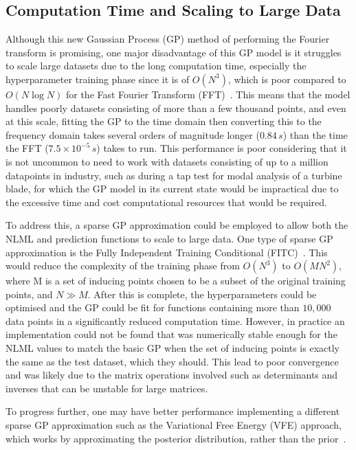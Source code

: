 \documentclass[12pt]{article}
\begin{document}
    \subsection{Computation Time and Scaling to Large Data}
    Although this new Gaussian Process (GP) method of performing the Fourier transform is promising, one major disadvantage of this GP model is it struggles to scale large datasets due to the long computation time, especially the hyperparameter training phase since it is of $O(N^3)$, which is poor compared to $O(N \log{N})$ for the Fast Fourier Transform (FFT)~\cite{murphy2023probabilistic}.
    This means that the model handles poorly datasets consisting of more than a few thousand points, and even at this scale, fitting the GP to the time domain then converting this to the frequency domain takes several orders of magnitude longer ($0.84 \, s$) than the time the FFT ($7.5 \times 10^{-5} \, s$) takes to run.
    This performance is poor considering that it is not uncommon to need to work with datasets consisting of up to a million datapoints in industry, such as during a tap test for modal analysis of a turbine blade, for which the GP model in its current state would be impractical due to the excessive time and cost computational resources that would be required.

    To address this, a sparse GP approximation could be employed to allow both the NLML and prediction functions to scale to large data.
    One type of sparse GP approximation is the Fully Independent Training Conditional (FITC)~\cite{q-candela}.
    This would reduce the complexity of the training phase from $O(N^3)$ to $O(MN^2)$, where M is a set of inducing points chosen to be a subset of the original training points, and $N \gg M$. 
    After this is complete, the hyperparameters could be optimised and the GP could be fit for functions containing more than $10,000$ data points in a significantly reduced computation time.
    However, in practice an implementation could not be found that was numerically stable enough for the NLML values to match the basic GP when the set of inducing points is exactly the same as the test dataset, which they should.
    This lead to poor convergence and was likely due to the matrix operations involved such as determinants and inverses that can be unstable for large matrices.

    To progress further, one may have better performance implementing a different sparse GP approximation such as the Variational Free Energy (VFE) approach, which works by approximating the posterior distribution, rather than the prior~\cite{murphy2023probabilistic}.
\end{document}

